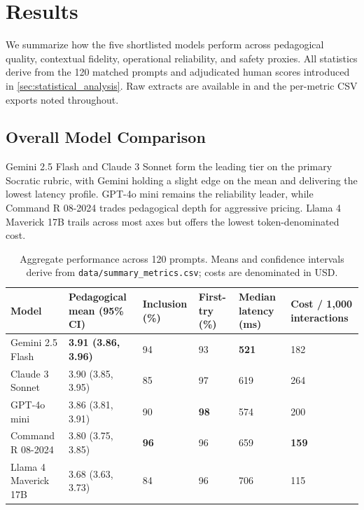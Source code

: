 \section{Results}\label{sec:results}

We summarize how the five shortlisted models perform across pedagogical quality, contextual fidelity, operational reliability, and safety proxies. All statistics derive from the 120 matched prompts and adjudicated human scores introduced in \cref{sec:statistical_analysis}. Raw extracts are available in  and the per-metric CSV exports noted throughout.

\subsection{Overall Model Comparison}\label{subsec:overall_results}

Gemini 2.5 Flash and Claude 3 Sonnet form the leading tier on the primary Socratic rubric, with Gemini holding a slight edge on the mean and delivering the lowest latency profile. GPT-4o mini remains the reliability leader, while Command R 08-2024 trades pedagogical depth for aggressive pricing. Llama 4 Maverick 17B trails across most axes but offers the lowest token-denominated cost.


\begin{table}[t]
\centering
\footnotesize
\caption{Aggregate performance across 120 prompts. Means and confidence intervals derive from \texttt{data/summary\_metrics.csv}; costs are denominated in USD.}
\label{tab:summary_scores}
\begin{tabularx}{\textwidth}{@{}>{\raggedright\arraybackslash}XYYYYY@{}}
\toprule
\textbf{Model} & \textbf{Pedagogical mean (95\% CI)} & \textbf{Inclusion (\%)} & \textbf{First-try (\%)} & \textbf{Median latency (ms)} & \textbf{Cost / 1{,}000 interactions} \\ \midrule
Gemini 2.5 Flash & \textbf{3.91 (3.86, 3.96)} & 94 & 93 & \textbf{521} & 182 \\
Claude 3 Sonnet & 3.90 (3.85, 3.95) & 85 & 97 & 619 & 264 \\
GPT-4o mini & 3.86 (3.81, 3.91) & 90 & \textbf{98} & 574 & 200 \\
Command R 08-2024 & 3.80 (3.75, 3.85) & \textbf{96} & 96 & 659 & \textbf{159} \\
Llama 4 Maverick 17B & 3.68 (3.63, 3.73) & 84 & 96 & 706 & 115 \\
\bottomrule
\end{tabularx}
\end{table}

